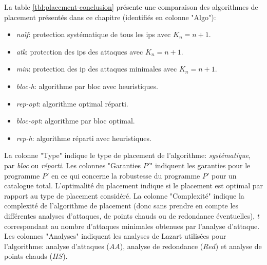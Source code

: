             La table \ref{tbl:placement-conclusion} présente une comparaison des algorithmes de placement présentés dans ce chapitre (identifiés en colonne "Algo"):
            \begin{itemize}
                \item \textit{naïf}: protection systématique de tous les \gls{ip}s avec $K_n = n + 1$.
                \item \textit{atk}: protection des \gls{ip}s des attaques avec $K_n = n + 1$.
                \item \textit{min}: protection des \gls{ip} des attaques minimales avec $K_n = n + 1$.
                \item \textit{bloc-h}: algorithme par bloc avec heuristiques.
                \item \textit{rep-opt}: algorithme optimal réparti.
                \item \textit{bloc-opt}: algorithme par bloc optimal.
                \item \textit{rep-h}: algorithme réparti avec heuristiques.
            \end{itemize}
            La colonne "Type" indique le type de placement de l'algorithme: \textit{systématique}, par \textit{bloc} ou \textit{réparti}.
            Les colonnes "Garanties $P'$" indiquent les garanties pour le programme $P'$ en ce qui concerne la robustesse du programme $P'$ pour un catalogue total. L'optimalité du placement indique si le placement est optimal par rapport au type de placement considéré.            
            La colonne "Complexité" indique la complexité de l'algorithme de placement (donc sans prendre en compte les différentes analyses d'attaques, de points chauds ou de redondance éventuelles), $t$ correspondant au nombre d'attaques minimales obtenues par l'analyse d'attaque.
            Les colonnes "Analyses" indiquent les analyses de Lazart utilisées pour l'algorithme: analyse d'attaques ($AA$), analyse de redondance ($Red$) et analyse de points chauds ($HS$).

